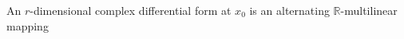 An $r$-dimensional complex differential form at $x_0$ is an alternating $\mathbb{R}$-multilinear mapping
